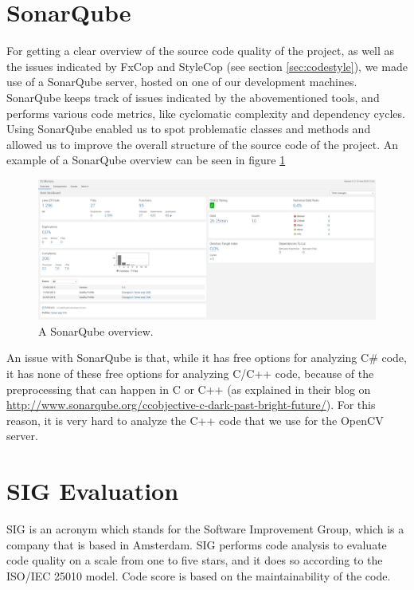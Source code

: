     \section{SonarQube} \label{sec:sonarqube}
        For getting a clear overview of the source code quality of the project, as 
        well as the issues indicated by FxCop and StyleCop (see section 
        \ref{sec:codestyle}), we made use of a SonarQube server, hosted on one of 
        our development machines. SonarQube keeps track of issues indicated by 
        the abovementioned tools, and performs various code metrics, like cyclomatic 
        complexity and dependency cycles. Using SonarQube enabled us to spot 
        problematic classes and methods and allowed us to improve the overall 
        structure of the source code of the project. An example of a SonarQube
        overview can be seen in figure \ref{fig:sonarqube}
        
        \begin{figure}[!ht]
            \centering
            \includegraphics[width=\textwidth]{SonarQube}
            \caption{A SonarQube overview.}
            \label{fig:sonarqube}
        \end{figure}
        
        An issue with SonarQube is that, while it has free options for analyzing
        C\# code, it has none of these free options for analyzing C/C++ code,
        because of the preprocessing that can happen in C or C++ (as explained
        in their blog on \url{http://www.sonarqube.org/ccobjective-c-dark-past-bright-future/}).
        For this reason, it is very hard to analyze the C++ code that we use for the
        OpenCV server.
        
    \section{SIG Evaluation} \label{sec:sigevaluation}
        SIG is an acronym which stands for the Software Improvement Group,
        which is a company that is based in Amsterdam. SIG performs code
        analysis to evaluate code quality on a scale from one to five stars,
        and it does so according to the ISO/IEC 25010 model. Code score is 
        based on the maintainability of the code.
        
